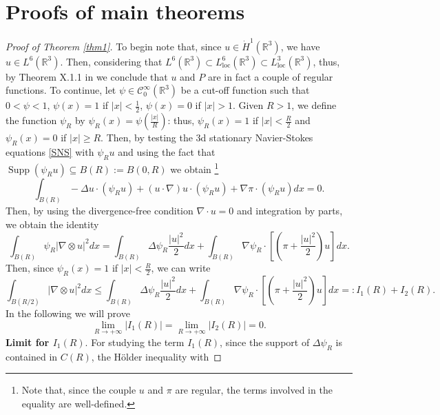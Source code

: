 \documentclass[a4paper,12pt]{amsart}
\theoremstyle{definition}
\theoremstyle{plain}
\def\vu{ u }
\def\vn{ \nabla }
\def\supp{\operatorname{Supp}}
\begin{document}
\section{Proofs of main theorems}\label{sec:3} 
\begin{proof}[Proof of Theorem \ref{thm1}]
To begin note that, since $\vu  \in \dot{H}^1(\mathbb{R}^3) $, we have $\vu \in L^6(\mathbb{R}^3) $. Then, considering that $L^6(\mathbb{R}^3) \subset L^6_{\text{loc} }(\mathbb{R}^3)  \subset L^3_{\text{loc} } (\mathbb{R}^3)$, 
thus, by Theorem X.1.1 in \cite{galdi2011introduction} we conclude that $\vu$ and $P$  are in fact a couple of regular functions. 
To continue, let $\psi\in {\mathcal{C}}^\infty_0 (\mathbb{R}^3) $ be a cut-off function such that $0<\psi<1$, $\psi(x)=1$ if $|x|<\frac{1}{2}$, $\psi(x)=0$ if $|x|>1$. Given $R>1$, {\color{black}we define the function $\psi_R$ by $\psi_R(x)=\psi(\frac{|x|}{R})$}: thus, $\psi_R(x)=1$ if $|x|< \frac R 2$ and $\psi_R(x)=0$ if $|x|\geq R$.
 Then, by testing the 3d stationary Navier-Stokes equations \eqref{SNS} with $\psi_R \vu$ and using the fact that $\supp(\psi_R \vu)\subseteq B(R):=B(0,R)$ we obtain \footnote{Note that, since the couple $\vu$ and $\pi$ are regular, the terms involved in the equality   are well-defined.}
\begin{equation}\label{eq. 3}
\int_{B(R)}-\Delta \vu \cdot\left(\psi_R \vu\right)+(\vu \cdot \vn) \vu \cdot\left(\psi_R \vu\right)+\vn \pi \cdot\left(\psi_R \vu\right) d x=0.
\end{equation}
Then, by using the divergence-free condition $\nabla \cdot \vu=0$ and integration by parts, we obtain 
the identity 
\begin{equation*}
\int_{B(R)} \psi_R|\vn \otimes \vu|^2 dx=\int_{B(R)} \Delta \psi_R \frac{|\vu|^2}{2} dx+
\int_{B(R)} \vn \psi_R \cdot\left[\left(\pi+\frac{|\vu|^2}{2}\right) \vu\right]dx.
\end{equation*}
Then, 
since  $\psi_R(x)= 1$ if $|x|< \frac R 2$, we can write
\begin{equation}\label{ineqmother}
\int_{B(R/2)}|\vn \otimes \vu|^2 dx 
 \leq  
\int_{B(R)} \Delta \psi_R \frac{|\vu|^2}{2} dx+ \int_{B(R)} \vn \psi_R \cdot\left[\left(\pi+\frac{|\vu|^2}{2}\right) \vu\right]dx 
=: 
I_1(R)+I_2(R)
. 
\end{equation}
In  the following we will prove 
\begin{equation}\label{LimitsAlphaBeta}
\displaystyle \lim_{R\to +\infty}  |I_1(R)|=\lim_{R\to +\infty}  |I_2(R)|=0.
\end{equation}
{\bf Limit for $I_1(R)$}. For studying the term $I_1(R)$, since the support of $\Delta\psi_R$ is contained in $C(R)$,  the H\"older inequality with 

\end{proof}
\end{document}
